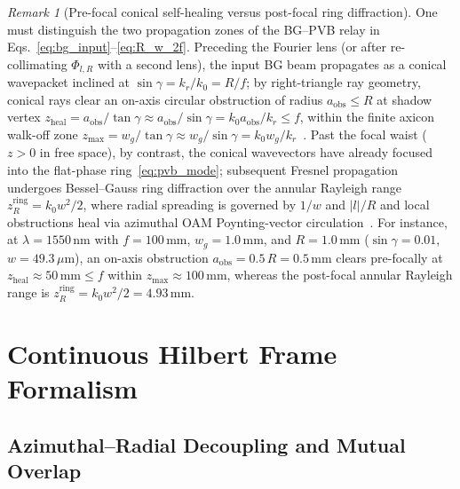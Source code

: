 \documentclass[aps,pra,onecolumn,notitlepage,11pt,tightenlines,nofootinbib,floatfix,longbibliography]{revtex4-2}
\theoremstyle{remark}
\newtheorem{remark}{Remark}
\newcommand{\abs}[1]{\lvert #1 \rvert}
\begin{document}
\begin{remark}[Pre-focal conical self-healing versus post-focal ring diffraction]
\label{rem:propagation}
One must distinguish the two propagation zones of the BG--PVB relay in Eqs.~\eqref{eq:bg_input}--\eqref{eq:R_w_2f}. Preceding the Fourier lens (or after re-collimating $\Phi_{l,R}$ with a second lens), the input BG beam propagates as a conical wavepacket inclined at $\sin\gamma = k_r/k_0 = R/f$; by right-triangle ray geometry, conical rays clear an on-axis circular obstruction of radius $a_{\mathrm{obs}} \le R$ at shadow vertex $z_{\mathrm{heal}} = a_{\mathrm{obs}}/\tan\gamma \approx a_{\mathrm{obs}}/\sin\gamma = k_0 a_{\mathrm{obs}}/k_r \le f$, within the finite axicon walk-off zone $z_{\max} = w_g/\tan\gamma \approx w_g/\sin\gamma = k_0 w_g/k_r$~\cite{Gori1987}. Past the focal waist ($z > 0$ in free space), by contrast, the conical wavevectors have already focused into the flat-phase ring~\eqref{eq:pvb_mode}; subsequent Fresnel propagation undergoes Bessel--Gauss ring diffraction over the annular Rayleigh range $z_R^{\mathrm{ring}} = k_0 w^2/2$, where radial spreading is governed by $1/w$ and $\abs{l}/R$ and local obstructions heal via azimuthal OAM Poynting-vector circulation~\cite{Reddy2016}. For instance, at $\lambda = 1550\,\mathrm{nm}$ with $f = 100\,\mathrm{mm}$, $w_g = 1.0\,\mathrm{mm}$, and $R = 1.0\,\mathrm{mm}$ ($\sin\gamma = 0.01$, $w = 49.3\,\mu\mathrm{m}$), an on-axis obstruction $a_{\mathrm{obs}} = 0.5\,R = 0.5\,\mathrm{mm}$ clears pre-focally at $z_{\mathrm{heal}} \approx 50\,\mathrm{mm} \le f$ within $z_{\max} \approx 100\,\mathrm{mm}$, whereas the post-focal annular Rayleigh range is $z_R^{\mathrm{ring}} = k_0 w^2/2 = 4.93\,\mathrm{mm}$.
\end{remark}

\section{Continuous Hilbert Frame Formalism}
\label{sec:frame_theory}

\subsection{Azimuthal--Radial Decoupling and Mutual Overlap}
\label{subsec:decoupling}
\end{document}
